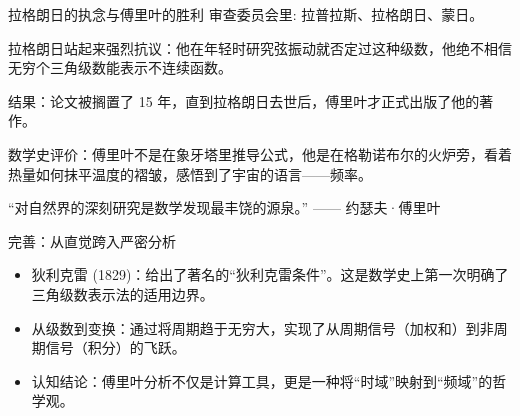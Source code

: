 \documentclass[
  ignorenonframetext,
]{beamer}
\providecommand{\tightlist}{%
  \setlength{\itemsep}{0pt}\setlength{\parskip}{0pt}}
\begin{document}
\begin{frame}{拉格朗日的执念与傅里叶的胜利}
\protect{}\label{ux62c9ux683cux6717ux65e5ux7684ux6267ux5ff5ux4e0eux5085ux91ccux53f6ux7684ux80dcux5229}
审查委员会里: 拉普拉斯、拉格朗日、蒙日。

拉格朗日站起来强烈抗议：他在年轻时研究弦振动就否定过这种级数，他绝不相信无穷个三角级数能表示不连续函数。

\begin{tcolorbox}[enhanced jigsaw, arc=.35mm, bottomrule=.15mm, bottomtitle=1mm, breakable, colback=white, colbacktitle=quarto-callout-note-color!10!white, colframe=quarto-callout-note-color-frame, coltitle=black, left=2mm, leftrule=.75mm, opacityback=0, opacitybacktitle=0.6, rightrule=.15mm, title=\textcolor{quarto-callout-note-color}{\faInfo}\hspace{0.5em}{Note}, titlerule=0mm, toprule=.15mm, toptitle=1mm]

结果：论文被搁置了 15
年，直到拉格朗日去世后，傅里叶才正式出版了他的著作。

\end{tcolorbox}

数学史评价：傅里叶不是在象牙塔里推导公式，他是在格勒诺布尔的火炉旁，看着热量如何抹平温度的褶皱，感悟到了宇宙的语言------频率。

``对自然界的深刻研究是数学发现最丰饶的源泉。'' ------ 约瑟夫·傅里叶

\begin{block}{完善：从直觉跨入严密分析}
\protect{}\label{ux5b8cux5584ux4eceux76f4ux89c9ux8de8ux5165ux4e25ux5bc6ux5206ux6790}
\begin{itemize}
\tightlist
\item
  {狄利克雷
  (1829)}：给出了著名的``狄利克雷条件''。这是数学史上第一次明确了三角级数表示法的适用边界。
\item
  {从级数到变换}：通过将周期趋于无穷大，实现了从周期信号（加权和）到非周期信号（积分）的飞跃。
\item
  {认知结论}：傅里叶分析不仅是计算工具，更是一种将``时域''映射到``频域''的哲学观。
\end{itemize}
\end{block}
\end{frame}
\end{document}
